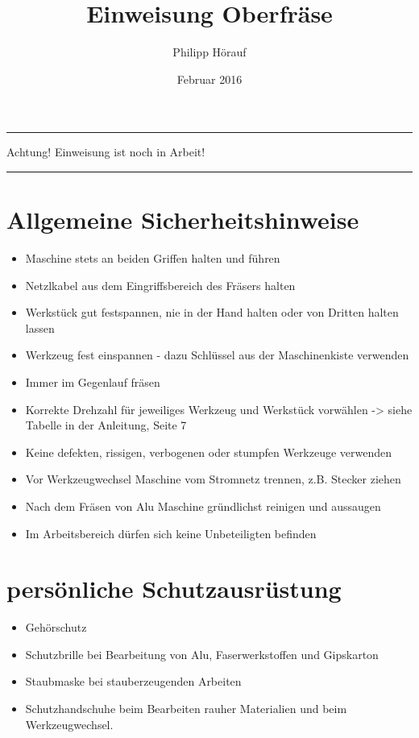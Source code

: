 \documentclass{\basedir/fablab-document}
\date{Februar 2016}
\author{Philipp Hörauf}
\title{Einweisung Oberfräse}
\begin{document}
\dosecttoc
\faketableofcontents
{}

\color{red}
\hrule
\begin{center}
\large{Achtung! Einweisung ist noch in Arbeit!}
\vspace{0.1cm}
\end{center}
\hrule
\color{black}

\section[Allgemeine Sicherheitshinweise]{Allgemeine Sicherheitshinweise}
\begin{itemize}
\item Maschine stets an beiden Griffen halten und führen
\item Netzlkabel aus dem Eingriffsbereich des Fräsers halten
\item Werkstück gut festspannen, nie in der Hand halten oder von Dritten halten lassen
\item Werkzeug fest einspannen - dazu Schlüssel aus der Maschinenkiste verwenden
\item Immer im Gegenlauf fräsen
\item Korrekte Drehzahl für jeweiliges Werkzeug und Werkstück vorwählen -> siehe Tabelle in der Anleitung, Seite 7
\item Keine defekten, rissigen, verbogenen oder stumpfen Werkzeuge verwenden
\item Vor Werkzeugwechsel Maschine vom Stromnetz trennen, z.B. Stecker ziehen
\item Nach dem Fräsen von Alu Maschine gründlichst reinigen und aussaugen
\item Im Arbeitsbereich dürfen sich keine Unbeteiligten befinden
\end{itemize}


\section{persönliche Schutzausrüstung}

\begin{itemize}
\item Gehörschutz
\item Schutzbrille bei Bearbeitung von Alu, Faserwerkstoffen und Gipskarton
\item Staubmaske bei stauberzeugenden Arbeiten 
\item Schutzhandschuhe beim Bearbeiten rauher Materialien und beim Werkzeugwechsel.
\end{itemize}
\end{document}
